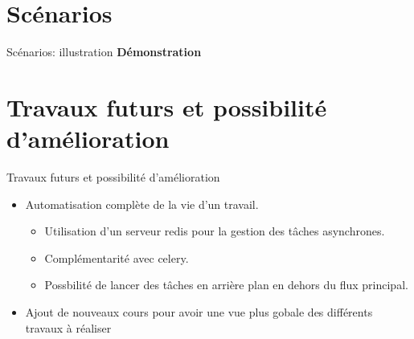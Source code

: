 \documentclass[numbering=fraction]{beamer}
\begin{document}
\section{Scénarios}
\begin{frame}{Scénarios: illustration}
    \centering %
\vfill %
\textbf{\Large Démonstration} %
\vfill %
\end{frame}
\section{Travaux futurs et possibilité d'amélioration}
\begin{frame}{Travaux futurs et possibilité d'amélioration}
    \begin{itemize}
        \item Automatisation complète de la vie d'un travail.
        \begin{itemize}
            \item Utilisation d'un serveur redis pour la gestion des tâches asynchrones.
            \item Complémentarité avec celery.
            \item Possbilité de lancer des tâches en arrière plan en dehors du flux principal.
        \end{itemize}
        \item Ajout de nouveaux cours pour avoir une vue plus gobale des différents travaux à réaliser
    \end{itemize}
    
\end{frame}
\end{document}
